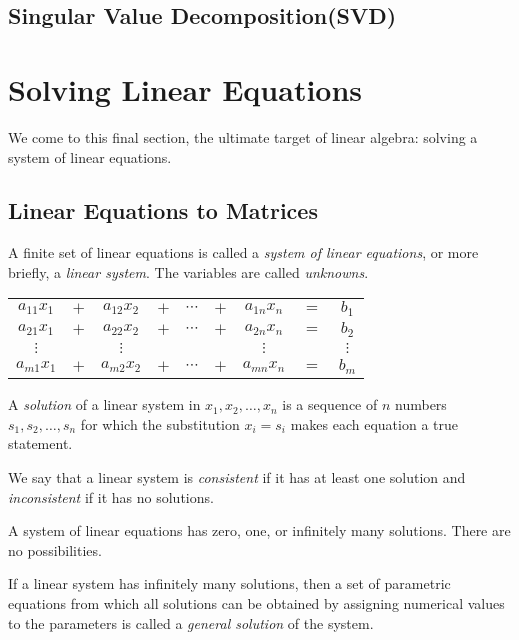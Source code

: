 \documentclass{report}
\begin{document}
		\subsection{Singular Value Decomposition(SVD)}
	
	\section{Solving Linear Equations}
	We come to this final section, the ultimate target of linear algebra: solving a system of linear equations.
		\subsection{Linear Equations to Matrices}
		A finite set of linear equations is called a \emph{system of linear equations}, or more briefly, a \emph{linear system}. The variables are called \emph{unknowns}.
		
		\begin{center}
			\begin{tabular}{ccccccccc}
				$a_{11}x_1$ & $+$ & $a_{12}x_2$ & $+$ & $\cdots$ & $+$ & $a_{1n}x_n$ & $=$ & $b_1$    \\
				$a_{21}x_1$ & $+$ & $a_{22}x_2$ & $+$ & $\cdots$ & $+$ & $a_{2n}x_n$ & $=$ & $b_2$    \\
				$\vdots$    &     & $\vdots$   &     &          &     & $\vdots$    &     & $\vdots$ \\
				$a_{m1}x_1$ & $+$ & $a_{m2}x_2$ & $+$ & $\cdots$ & $+$ & $a_{mn}x_n$ & $=$ & $b_m$   
			\end{tabular}
		\end{center}
		
		A \emph{solution} of a linear system in $x_1,x_2,\dots,x_n$ is a sequence of $n$ numbers $s_1,s_2,\dots,s_n$ for which the substitution $x_i=s_i$ makes each equation a true statement.
		
		We say that a linear system is \emph{consistent} if it has at least one solution and \emph{inconsistent} if it has no solutions.
		
		\begin{thm}
			A system of linear equations has zero, one, or infinitely many solutions. There are no possibilities.
		\end{thm}
		
		If a linear system has infinitely many solutions, then a set of parametric equations from which all solutions can be obtained by assigning numerical values to the parameters is called a \emph{general solution} of the system.
		
\end{document}
